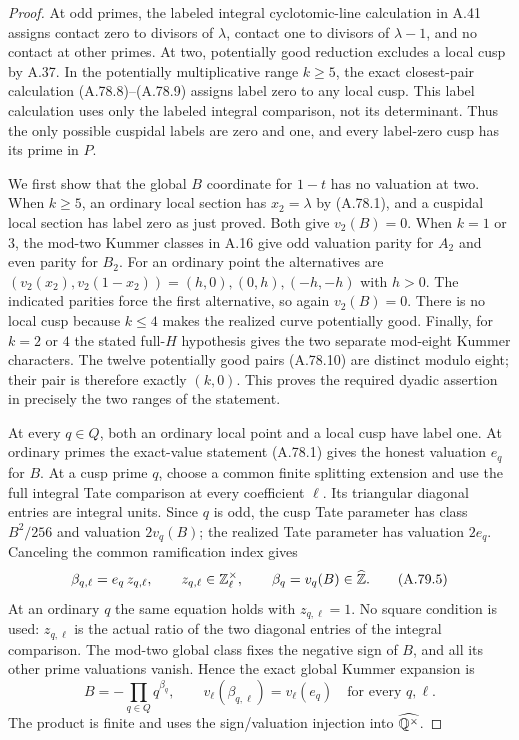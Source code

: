 \begin{proof}
At odd primes, the labeled integral cyclotomic-line calculation
in A.41 assigns contact zero to divisors of $\lambda$, contact
one to divisors of $\lambda-1$, and no contact at other primes.
At two, potentially good reduction excludes a local cusp by
A.37.  In the potentially multiplicative range $k\ge5$,
the exact closest-pair calculation (A.78.8)--(A.78.9) assigns
label zero to any local cusp.  This label calculation uses only
the labeled integral comparison, not its determinant.
Thus the only possible cuspidal labels are zero and one,
and every label-zero cusp has its prime in $P$.

We first show that the global $B$ coordinate for $1-t$ has
no valuation at two.  When $k\ge5$, an ordinary local section
has $x_2=\lambda$ by (A.78.1), and a cuspidal local section
has label zero as just proved.  Both give $v_2(B)=0$.
When $k=1$ or $3$, the mod-two Kummer classes in A.16 give
odd valuation parity for $A_2$ and even parity for $B_2$.
For an ordinary point the alternatives are
$(v_2(x_2),v_2(1-x_2))=(h,0),(0,h),(-h,-h)$ with $h>0$.
The indicated parities force the first alternative, so again
$v_2(B)=0$.  There is no local cusp because $k\le4$ makes
the realized curve potentially good.
Finally, for $k=2$ or $4$ the stated full-$H$ hypothesis gives
the two separate mod-eight Kummer characters.
The twelve potentially good pairs (A.78.10) are distinct
modulo eight; their pair is therefore exactly $(k,0)$.
This proves the required dyadic assertion in precisely the
two ranges of the statement.

At every $q\in Q$, both an ordinary local point and a local
cusp have label one.  At ordinary primes the exact-value
statement (A.78.1) gives the honest valuation $e_q$ for $B$.
At a cusp prime $q$, choose a common finite splitting
extension and use the full integral Tate comparison at every
coefficient $\ell$.  Its triangular diagonal entries are
integral units.  Since $q$ is odd, the cusp Tate parameter
has class $B^2/256$ and valuation $2v_q(B)$; the realized
Tate parameter has valuation $2e_q$.
Canceling the common ramification index gives
\[
        \beta_{q,\ell}=e_q\,z_{q,\ell},
                  \qquad z_{q,\ell}\in\mathbb Z_\ell^\times,
        \qquad\beta_q=v_q(B)\in\widehat{\mathbb Z}.
\tag{A.79.5}
\]
At an ordinary $q$ the same equation holds with $z_{q,\ell}=1$.
No square condition is used: $z_{q,\ell}$ is the actual
ratio of the two diagonal entries of the integral comparison.
The mod-two global class fixes the negative sign of $B$,
and all its other prime valuations vanish.  Hence the exact
global Kummer expansion is
\[
                  B=-\prod_{q\in Q}q^{\beta_q},
          \qquad v_\ell(\beta_{q,\ell})=v_\ell(e_q)
                    \quad\text{for every }q,\ell.
\tag{A.79.6}
\]
The product is finite and uses the sign/valuation injection
into $\widehat{\mathbb Q^\times}$.


\end{proof}
